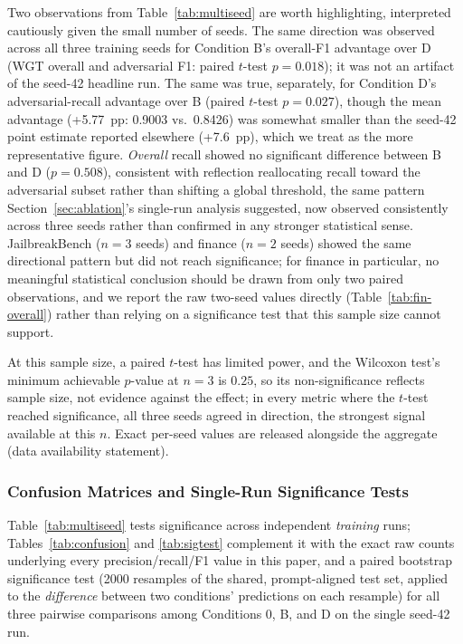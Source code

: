\documentclass[superintelligence,article,accept,moreauthors]{Definitions/mdpi}
\begin{document}
Two observations from Table~\ref{tab:multiseed} are worth highlighting, interpreted cautiously given the small number of seeds. The same direction was observed across all three training seeds for Condition B's overall-F1 advantage over D (WGT overall and adversarial F1: paired $t$-test $p=0.018$); it was not an artifact of the seed-42 headline run. The same was true, separately, for Condition D's adversarial-recall advantage over B (paired $t$-test $p=0.027$), though the mean advantage (+5.77~pp: 0.9003 vs.\ 0.8426) was somewhat smaller than the seed-42 point estimate reported elsewhere (+7.6~pp), which we treat as the more representative figure. \emph{Overall} recall showed no significant difference between B and D ($p=0.508$), consistent with reflection reallocating recall toward the adversarial subset rather than shifting a global threshold, the same pattern Section~\ref{sec:ablation}'s single-run analysis suggested, now observed consistently across three seeds rather than confirmed in any stronger statistical sense. JailbreakBench ($n=3$ seeds) and finance ($n=2$ seeds) showed the same directional pattern but did not reach significance; for finance in particular, no meaningful statistical conclusion should be drawn from only two paired observations, and we report the raw two-seed values directly (Table~\ref{tab:fin-overall}) rather than relying on a significance test that this sample size cannot support.

At this sample size, a paired $t$-test has limited power, and the Wilcoxon test's minimum achievable $p$-value at $n=3$ is $0.25$, so its non-significance reflects sample size, not evidence against the effect; in every metric where the $t$-test reached significance, all three seeds agreed in direction, the strongest signal available at this $n$. Exact per-seed values are released alongside the aggregate (data availability statement).

\subsubsection{Confusion Matrices and Single-Run Significance Tests}
\label{sec:confusion}

Table~\ref{tab:multiseed} tests significance across independent \emph{training} runs; Tables~\ref{tab:confusion} and \ref{tab:sigtest} complement it with the exact raw counts underlying every precision/recall/F1 value in this paper, and a paired bootstrap significance test (2000 resamples of the shared, prompt-aligned test set, applied to the \emph{difference} between two conditions' predictions on each resample) for all three pairwise comparisons among Conditions 0, B, and D on the single seed-42 run.
\end{document}
